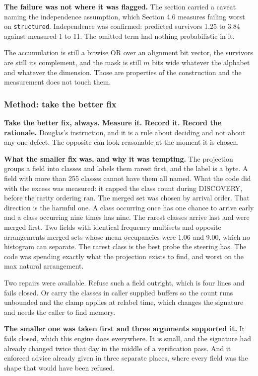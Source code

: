 \textbf{The failure was not where it was flagged.} The section carried a caveat naming the independence assumption, which Section 4.6 measures failing worst on \texttt{structured}. Independence was confirmed: predicted survivors 1.25 to 3.84 against measured 1 to 11. The omitted term had nothing probabilistic in it.

The accumulation is still a bitwise OR over an alignment bit vector, the survivors are still its complement, and the mask is still \(m\) bits wide whatever the alphabet and whatever the dimension. Those are properties of the construction and the measurement does not touch them.

\subsubsection{Method: take the better fix}

\textbf{Take the better fix, always. Measure it. Record it. Record the rationale.} Douglas's instruction, and it is a rule about deciding and not about any one defect. The opposite can look reasonable at the moment it is chosen.

\textbf{What the smaller fix was, and why it was tempting.} The projection groups a field into classes and labels them rarest first, and the label is a byte. A field with more than 255 classes cannot have them all named. What the code did with the excess was measured: it capped the class count during DISCOVERY, before the rarity ordering ran. The merged set was chosen by arrival order. That direction is the harmful one. A class occurring once has one chance to arrive early and a class occurring nine times has nine. The rarest classes arrive last and were merged first. Two fields with identical frequency multisets and opposite arrangements merged sets whose mean occupancies were 1.06 and 9.00, which no histogram can separate. The rarest class is the best probe the steering has. The code was spending exactly what the projection exists to find, and worst on the max natural arrangement.

Two repairs were available. Refuse such a field outright, which is four lines and fails closed. Or carry the classes in caller supplied buffers so the count runs unbounded and the clamp applies at relabel time, which changes the signature and needs the caller to find memory.

\textbf{The smaller one was taken first and three arguments supported it.} It fails closed, which this engine does everywhere. It is small, and the signature had already changed twice that day in the middle of a verification pass. And it enforced advice already given in three separate places, where every field was the shape that would have been refused.


